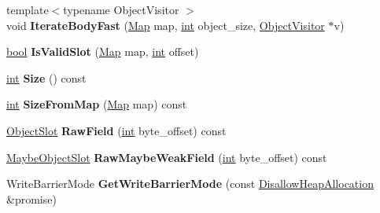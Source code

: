 \begin{DoxyCompactItemize}
{\footnotesize template$<$typename Object\+Visitor $>$ }\\void {\bfseries Iterate\+Body\+Fast} (\mbox{\hyperlink{classv8_1_1internal_1_1Map}{Map}} map, \mbox{\hyperlink{classint}{int}} object\+\_\+size, \mbox{\hyperlink{classv8_1_1internal_1_1ObjectVisitor}{Object\+Visitor}} $\ast$v)
\item 
\mbox{\label{classv8_1_1internal_1_1HeapObject_a62e0cae5cf14e635e3aa9605429f2fce}} 
\mbox{\hyperlink{classbool}{bool}} {\bfseries Is\+Valid\+Slot} (\mbox{\hyperlink{classv8_1_1internal_1_1Map}{Map}} map, \mbox{\hyperlink{classint}{int}} offset)
\item 
\mbox{\label{classv8_1_1internal_1_1HeapObject_ac32fa5ad2596e060d274d2ddfb4ffe0d}} 
\mbox{\hyperlink{classint}{int}} {\bfseries Size} () const
\item 
\mbox{\label{classv8_1_1internal_1_1HeapObject_a6a28eddee74e83b7f14a63d8bed0c6eb}} 
\mbox{\hyperlink{classint}{int}} {\bfseries Size\+From\+Map} (\mbox{\hyperlink{classv8_1_1internal_1_1Map}{Map}} map) const
\item 
\mbox{\label{classv8_1_1internal_1_1HeapObject_a6314c80d035c50833bb03ef2abc80d2e}} 
\mbox{\hyperlink{classv8_1_1internal_1_1ObjectSlot}{Object\+Slot}} {\bfseries Raw\+Field} (\mbox{\hyperlink{classint}{int}} byte\+\_\+offset) const
\item 
\mbox{\label{classv8_1_1internal_1_1HeapObject_a6322b3840e7cf0bd351c9c8f90ff7254}} 
\mbox{\hyperlink{classv8_1_1internal_1_1MaybeObjectSlot}{Maybe\+Object\+Slot}} {\bfseries Raw\+Maybe\+Weak\+Field} (\mbox{\hyperlink{classint}{int}} byte\+\_\+offset) const
\item 
\mbox{\label{classv8_1_1internal_1_1HeapObject_acfba4c3365f4b6c70caa7c0ec14e4244}} 
Write\+Barrier\+Mode {\bfseries Get\+Write\+Barrier\+Mode} (const \mbox{\hyperlink{classv8_1_1internal_1_1PerThreadAssertScopeDebugOnly}{Disallow\+Heap\+Allocation}} \&promise)
\item 
\mbox{\label{classv8_1_1internal_1_1HeapObject_ad2ac162b5f328c698255e2b0dd60a5d9}} 

\end{DoxyCompactItemize}
